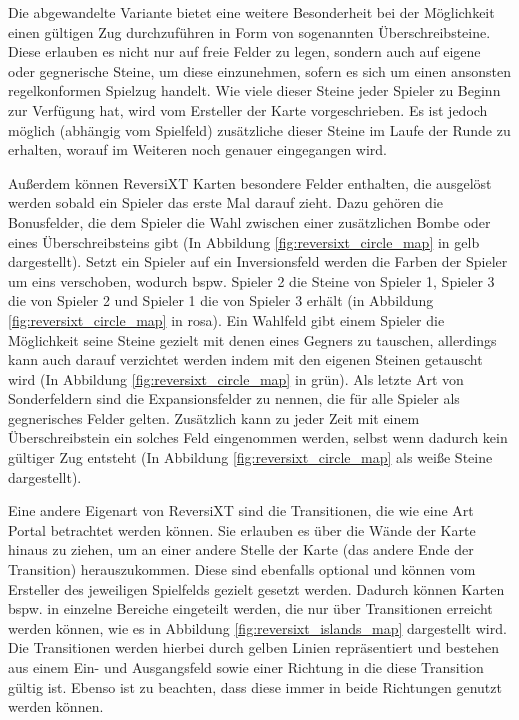 \documentclass[12pt,a4paper,bibliography=totocnumbered,listof=totocnumbered]{article}
\begin{document}
Die abgewandelte Variante bietet eine weitere Besonderheit bei der Möglichkeit einen gültigen Zug durchzuführen in Form von sogenannten Überschreibsteine. Diese erlauben es nicht nur auf freie Felder zu legen, sondern auch auf eigene oder gegnerische Steine, um diese einzunehmen, sofern es sich um einen ansonsten regelkonformen Spielzug handelt. Wie viele dieser Steine jeder Spieler zu Beginn zur Verfügung hat, wird vom Ersteller der Karte vorgeschrieben. Es ist jedoch möglich (abhängig vom Spielfeld) zusätzliche dieser Steine im Laufe der Runde zu erhalten, worauf im Weiteren noch genauer eingegangen wird. 

Außerdem können ReversiXT Karten besondere Felder enthalten, die ausgelöst werden sobald ein Spieler das erste Mal darauf zieht. Dazu gehören die Bonusfelder, die dem Spieler die Wahl zwischen einer zusätzlichen Bombe oder eines Überschreibsteins gibt (In Abbildung \ref{fig:reversixt_circle_map} in gelb dargestellt). Setzt ein Spieler auf ein Inversionsfeld werden die Farben der Spieler um eins verschoben, wodurch bspw. Spieler 2 die Steine von Spieler 1, Spieler 3 die von Spieler 2 und Spieler 1 die von Spieler 3 erhält (in Abbildung \ref{fig:reversixt_circle_map} in rosa). Ein Wahlfeld gibt einem Spieler die Möglichkeit seine Steine gezielt mit denen eines Gegners zu tauschen, allerdings kann auch darauf verzichtet werden indem mit den eigenen Steinen \glqq getauscht\grqq{} wird (In Abbildung \ref{fig:reversixt_circle_map} in grün). Als letzte Art von Sonderfeldern sind die Expansionsfelder zu nennen, die für alle Spieler als gegnerisches Felder gelten. Zusätzlich kann zu jeder Zeit mit einem Überschreibstein ein solches Feld eingenommen werden, selbst wenn dadurch kein gültiger Zug entsteht (In Abbildung \ref{fig:reversixt_circle_map} als weiße Steine dargestellt).

Eine andere Eigenart von ReversiXT sind die Transitionen, die wie eine Art Portal betrachtet werden können. Sie erlauben es über die Wände der Karte hinaus zu ziehen, um an einer andere Stelle der Karte (das andere Ende der Transition) herauszukommen. Diese sind ebenfalls optional und können vom Ersteller des jeweiligen Spielfelds gezielt gesetzt werden. Dadurch können Karten bspw. in einzelne Bereiche eingeteilt werden, die nur über Transitionen erreicht werden können, wie es in Abbildung \ref{fig:reversixt_islands_map} dargestellt wird. Die Transitionen werden hierbei durch gelben Linien repräsentiert und bestehen aus einem Ein- und Ausgangsfeld sowie einer Richtung in die diese Transition gültig ist. Ebenso ist zu beachten, dass diese immer in beide Richtungen genutzt werden können.
\end{document}
